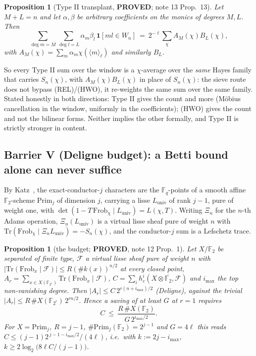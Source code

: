 \documentclass[10pt]{article}
\theoremstyle{plain}
\newtheorem{proposition}[theorem]{Proposition}
\theoremstyle{definition}
\newcommand{\F}{\mathbb F}
\newcommand{\Prim}{\mathrm{Prim}}
\newcommand{\Luniv}{L_{\mathrm{univ}}}
\newcommand{\Tr}{\mathrm{Tr}}
\newcommand{\imax}{i_{\max}}
\newcommand{\proved}{\textcolor{proved}{\textsf{\textbf{\footnotesize PROVED}}}}
\begin{document}
\begin{proposition}[Type II transplant, \proved; note 13 Prop.~13]
\label{prop:typeII}
Let $M+L=n$ and let $\alpha,\beta$ be arbitrary coefficients on the monics of
degrees $M,L$. Then
\[
 \sum_{\deg m=M}\sum_{\deg l=L}\alpha_m\beta_l\,\mathbf1[ml\in W_n]
 \ =\ 2^{-\ell}\sum_{\chi}A_M(\chi)B_L(\chi),
\]
with $A_M(\chi)=\sum_m\alpha_m\chi(\langle m\rangle_\ell)$ and similarly $B_L$.
\end{proposition}

So every Type II sum over the window is a $\chi$-average over the \emph{same}
Hayes family that carries $S_n(\chi)$, with $A_M(\chi)B_L(\chi)$ in place of
$S_n(\chi)$: the sieve route does not bypass (REL)/(HWO), it re-weights the same
sum over the same family. Stated honestly in both directions: Type II gives
the count and more (M\"obius cancellation in the window, uniformly in the
coefficients); (HWO) gives the count and not the bilinear forms. Neither
implies the other formally, and Type II is strictly stronger in content.

\subsection{Barrier V (Deligne budget): a Betti bound alone can never suffice}
\label{sec:bar5}

By Katz~\cite{Katz13}, the exact-conductor-$j$ characters are the $\F_q$-points
of a smooth affine $\F_2$-scheme $\Prim_j$ of dimension $j$, carrying a lisse
$\Luniv$ of rank $j-1$, pure of weight one, with
$\det(1-T\,\mathrm{Frob}_\chi\mid\Luniv)=L(\chi,T)$. Writing $\Xi_n$ for the
$n$-th Adams operation, $\Xi_n(\Luniv)$ is a virtual lisse sheaf pure of weight
$n$ with $\Tr(\mathrm{Frob}_\chi\mid\Xi_n\Luniv)=-S_n(\chi)$, and the
conductor-$j$ sum is a Lefschetz trace.

\begin{proposition}[the budget; \proved, note 12 Prop.~1]\label{prop:budget}
Let $X/\F_2$ be separated of finite type, $\mathcal F$ a virtual lisse sheaf
pure of weight $n$ with $|\Tr(\mathrm{Frob}_x\mid\mathcal F)|\le R(\#k(x))^{n/2}$
at every closed point, $A_r=\sum_{x\in X(\F_{2^r})}\Tr(\mathrm{Frob}_x\mid\mathcal F)$,
$C=\sum_ih^i_c(X\otimes\overline{\F_2},\mathcal F)$ and $\imax$ the top
non-vanishing degree. Then $|A_r|\le C\,2^{r(n+\imax)/2}$ (Deligne), against the
trivial $|A_r|\le R\,\#X(\F_{2^r})\,2^{rn/2}$. Hence a saving of at least $G$
at $r=1$ requires
\[
 C\ \le\ \frac{R\,\#X(\F_2)}{G\,2^{\imax/2}} .
\]
For $X=\Prim_j$, $R=j-1$, $\#\Prim_j(\F_2)=2^{j-1}$ and $G=4\ell$ this reads
$C\le(j-1)2^{\,j-1-\imax/2}/(4\ell)$, i.e.\ with $k:=2j-\imax$,
$k\ge2\log_2\bigl(8\ell C/(j-1)\bigr)$.
\end{proposition}
\end{document}
